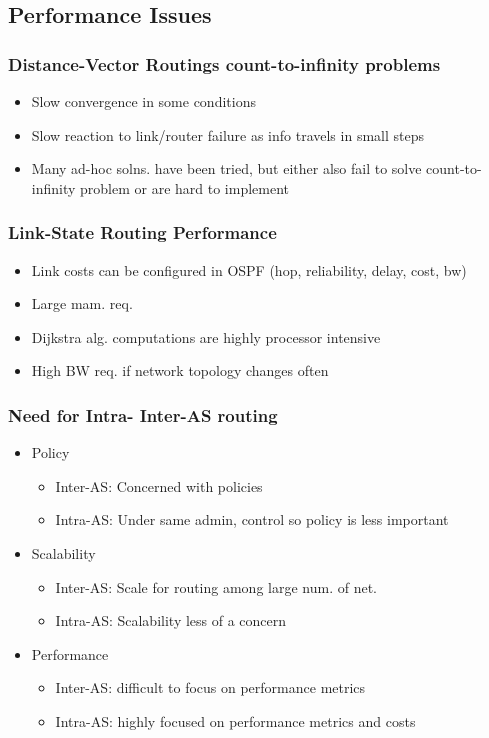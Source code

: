 \subsection{Performance Issues}
\subsubsection{Distance-Vector Routings count-to-infinity problems}
\begin{itemize}
	\item Slow convergence in some conditions
	\item Slow reaction to link/router failure as info travels in small
		steps
	\item Many ad-hoc solns. have been tried, but either also fail to solve
		count-to-infinity problem or are hard to implement
\end{itemize}
\subsubsection{Link-State Routing Performance}
\begin{itemize}
	\item Link costs can be configured in OSPF (hop, reliability, delay,
		cost, bw)
	\item Large mam. req.
	\item Dijkstra alg. computations are highly processor intensive
	\item High BW req. if network topology changes often
\end{itemize}
\subsubsection{Need for Intra- Inter-AS routing}
\begin{itemize}
	\item Policy
	\begin{itemize}
		\item Inter-AS: Concerned with policies
		\item Intra-AS: Under same admin, control so policy is less
			important
	\end{itemize}
	\item Scalability
		\begin{itemize}
			\item Inter-AS: Scale for routing among large num. of
				net.
			\item Intra-AS: Scalability less of a concern
		\end{itemize}
	\item Performance
	\begin{itemize}
		\item Inter-AS: difficult to focus on performance metrics
		\item Intra-AS: highly focused on performance metrics and costs
	\end{itemize}
\end{itemize}
